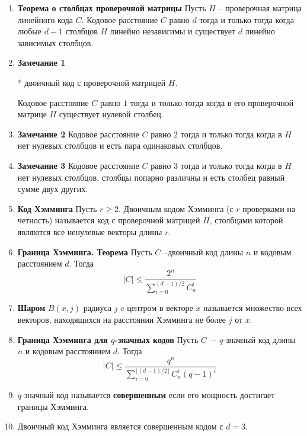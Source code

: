 \documentclass[a4paper, 12pt]{report}
\begin{document}
\begin{enumerate}


\item \textbf{Теорема о столбцах проверочной матрицы}
Пусть $H$ – проверочная матрица линейного кода $C$. Кодовое
расстояние $C$ равно $d$ тогда и только тогда когда любые $d - 1$
столбцов $H$ линейно независимы и существует $d$ линейно
зависимых столбцов.


\item \textbf{Замечание 1}

* двоичный код с проверочной матрицей $H$.

Кодовое расстояние $C$ равно $1$ тогда и только тогда когда в
его проверочной матрице $H$ существует нулевой столбец.

\item \textbf{Замечание 2}
Кодовое расстояние $C$ равно $2$ тогда и только тогда когда в
$H$ нет нулевых столбцов и есть пара одинаковых столбцов.

\item \textbf{Замечание 3}
Кодовое расстояние $C$ равно $3$ тогда и только тогда когда в
$H$ нет нулевых столбцов, столбцы попарно различны и есть
столбец равный сумме двух других.

\item \textbf{Код Хэмминга}
Пусть $r \geq 2$. Двоичным кодом Хэмминга (с $r$ проверками на
четность) называется код с проверочной матрицей $H$,
столбцами которой являются все ненулевые векторы длины $r$.

\item \textbf{Граница Хэмминга. Теорема}
Пусть $C$ –двоичный код длины $n$ и кодовым расстоянием $d$.
Тогда
\[  |C| \leq \frac {2^n} {{\sum_{i = 0}^{(d - 1)/2} C_n^i}} \]


\item \textbf{Шаром }  $B(x, j)$ радиуса $j$ c центром в векторе $x$ называется
множество всех векторов, находящихся на расстоянии
Хэмминга не более $j$ от $x$.

\item \textbf{Граница Хэмминга для $q$-значных кодов}
Пусть $C$ –- $q$-значный код длины $n$ и кодовым расстоянием $d$.
Тогда
\[  |C| \leq \frac {q^n} {{\sum_{i = 0}^{\lfloor(d - 1)/2\rfloor} C_n^i (q - 1)^i}} \]

\item
$q$-значный код называется \textbf{совершенным} если его мощность
достигает границы Хэмминга.

\item 
Двоичный код Хэмминга является совершенным кодом с $d = 3$.


\end{enumerate}
\end{document}
